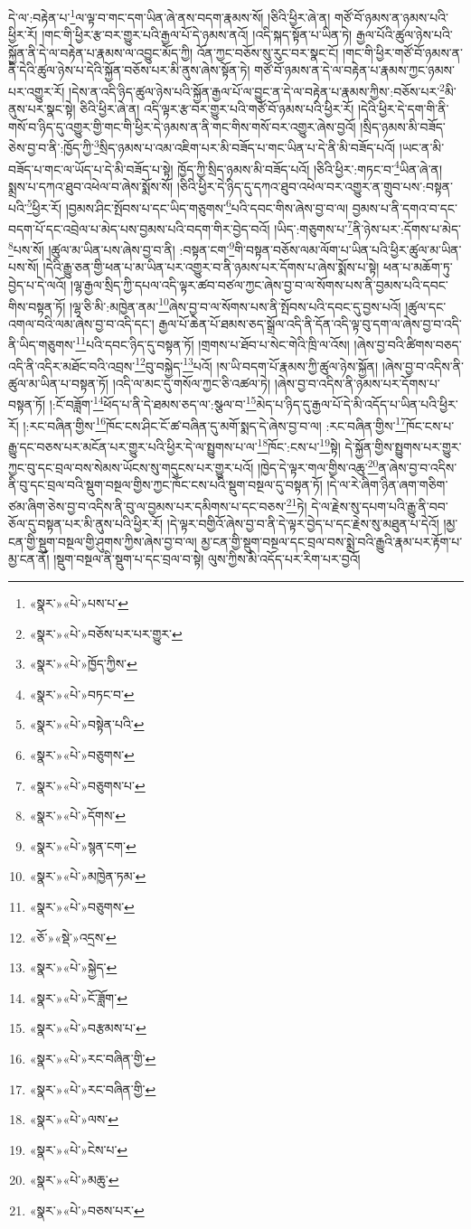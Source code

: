 དེ་ལ་:བརྟེན་པ་\footnote{«སྣར་»«པེ་»པས་པ་}ལ་ལྟ་བ་གང་དག་ཡིན་ཞེ་ནས་བདག་རྣམས་སོ། །ཅིའི་ཕྱིར་ཞེ་ན། གཙོ་བོ་ཉམས་ན་ཉམས་པའི་ཕྱིར་རོ། །གང་གི་ཕྱིར་རྩ་བར་གྱུར་པའི་རྒྱལ་པོ་དེ་ཉམས་ནའོ། །འདི་སྐད་སྟོན་པ་ཡིན་ཏེ། རྒྱལ་པོའི་ཚུལ་ཉེས་པའི་སྐྱོན་ནི་དེ་ལ་བརྟེན་པ་རྣམས་ལ་འབྱུང་མོད་ཀྱི། འོན་ཀྱང་བཅོས་སུ་རུང་བར་སྣང་ངོ། །གང་གི་ཕྱིར་གཙོ་བོ་ཉམས་ན་ནི་དེའི་ཚུལ་ཉེས་པ་དེའི་སྐྱོན་བཅོས་པར་མི་ནུས་ཞེས་སྟོན་ཏེ། གཙོ་བོ་ཉམས་ན་དེ་ལ་བརྟེན་པ་རྣམས་ཀྱང་ཉམས་པར་འགྱུར་རོ། །དེས་ན་འདི་ཉིད་ཚུལ་ཉེས་པའི་སྐྱོན་རྒྱལ་པོ་ལ་བྱུང་ན་དེ་ལ་བརྟེན་པ་རྣམས་ཀྱིས་:བཅོས་པར་\footnote{«སྣར་»«པེ་»བཅོས་པར་པར་གྱུར་}མི་ནུས་པར་སྣང་སྟེ། ཅིའི་ཕྱིར་ཞེ་ན། འདི་ལྟར་རྩ་བར་གྱུར་པའི་གཙོ་བོ་ཉམས་པའི་ཕྱིར་རོ། །དེའི་ཕྱིར་དེ་དག་གི་ནི་གསོ་བ་ཉིད་དུ་འགྱུར་གྱི་གང་གི་ཕྱིར་དེ་ཉམས་ན་ནི་གང་གིས་གསོ་བར་འགྱུར་ཞེས་བྱའོ། །སྲིད་ཉམས་མི་བཟོད་ཅེས་བྱ་བ་ནི་:ཁྱོད་ཀྱི་\footnote{«སྣར་»«པེ་»ཁྱོད་ཀྱིས་}སྲིད་ཉམས་པ་འམ་འཇིག་པར་མི་བཟོད་པ་གང་ཡིན་པ་དེ་ནི་མི་བཟོད་པའོ། །ཡང་ན་མི་བཟོད་པ་གང་ལ་ཡོད་པ་དེ་མི་བཟོད་པ་སྟེ། ཁྱོད་ཀྱི་སྲིད་ཉམས་མི་བཟོད་པའོ། །ཅིའི་ཕྱིར་:གཏང་བ་\footnote{«སྣར་»«པེ་»བཏང་བ་}ཡིན་ཞེ་ན། སྨྲས་པ་དཀའ་ཐུབ་འཕེལ་བ་ཞེས་སྨོས་སོ། །ཅིའི་ཕྱིར་དེ་ཉིད་དུ་དཀའ་ཐུབ་འཕེལ་བར་འགྱུར་ན་གྲུབ་པས་:བསྟན་པའི་\footnote{«སྣར་»«པེ་»བསྟེན་པའི་}ཕྱིར་རོ། །བྱམས་ཤིང་སྤོབས་པ་དང་ཡིད་གཅུགས་\footnote{«སྣར་»«པེ་»བཅུགས་}པའི་དབང་གིས་ཞེས་བྱ་བ་ལ། བྱམས་པ་ནི་དགའ་བ་དང་བདག་པོ་དང་འབྲེལ་པ་མེད་པས་བྱམས་པའི་བདག་གིར་བྱེད་བའོ། །ཡིད་:གཅུགས་པ་\footnote{«སྣར་»«པེ་»བཅུགས་པ་}ནི་ཉེས་པར་:དོགས་པ་མེད་\footnote{«སྣར་»«པེ་»དོགས་}པས་སོ། །ཚུལ་མ་ཡིན་པས་ཞེས་བྱ་བ་ནི། :བསྟན་ངག་\footnote{«སྣར་»«པེ་»སྙན་ངག་}གི་བསྟན་བཅོས་ལམ་ལོག་པ་ཡིན་པའི་ཕྱིར་ཚུལ་མ་ཡིན་པས་སོ། །དེའི་རྒྱུ་ཅན་གྱི་ཕན་པ་མ་ཡིན་པར་འགྱུར་བ་ནི་ཉམས་པར་དོགས་པ་ཞེས་སྨོས་པ་སྟེ། ཕན་པ་མཆོག་ཏུ་བྱེད་པ་དེ་ལའོ། །ལྷ་རྒྱལ་སྲིད་ཀྱི་དཔལ་འདི་ལྟར་ཚབ་བཙལ་ཀྱང་ཞེས་བྱ་བ་ལ་སོགས་པས་ནི་བྱམས་པའི་དབང་གིས་བསྟན་ཏོ། །ལྷ་ཅི་མི་:མཁྱེན་ནམ་\footnote{«སྣར་»«པེ་»མཁྱེན་ཏམ་}ཞེས་བྱ་བ་ལ་སོགས་པས་ནི་སྤོབས་པའི་དབང་དུ་བྱས་པའོ། །ཚུལ་དང་འགལ་བའི་ལམ་ཞེས་བྱ་བ་འདི་དང་། རྒྱལ་པོ་ཆེན་པོ་ཐམས་ཅད་སྒྲོལ་འདི་ནི་དོན་འདི་ལྟ་བུ་དག་ལ་ཞེས་བྱ་བ་འདི་ནི་ཡིད་གཅུགས་\footnote{«སྣར་»«པེ་»བཅུགས་}པའི་དབང་ཉིད་དུ་བསྟན་ཏོ། །གྲགས་པ་ཐོབ་པ་སེང་གེའི་ཁྲི་ལ་འོས། །ཞེས་བྱ་བའི་ཚིགས་བཅད་འདི་ནི་འདིར་མཐོང་བའི་འབྲས་\footnote{«ཅོ་»«སྡེ་»འདྲས་}བུ་བསྐྱེད་\footnote{«སྣར་»«པེ་»སྐྱེད་}པའོ། །ས་ཡི་བདག་པོ་རྣམས་ཀྱི་ཚུལ་ཉེས་སྐྱོན། །ཞེས་བྱ་བ་འདིས་ནི་ཚུལ་མ་ཡིན་པ་བསྟན་ཏོ། །འདི་ལ་མང་དུ་གསོལ་ཀྱང་ཅི་འཚལ་ཏེ། །ཞེས་བྱ་བ་འདིས་ནི་ཉམས་པར་དོགས་པ་བསྟན་ཏོ། །:ངོ་བཟློག་\footnote{«སྣར་»«པེ་»ངོ་ཟློག་}ཕོད་པ་ནི་དེ་ཐམས་ཅད་ལ་:སྩལ་བ་\footnote{«སྣར་»«པེ་»བརྩམས་པ་}མེད་པ་ཉིད་དུ་རྒྱལ་པོ་དེ་མི་འདོད་པ་ཡིན་པའི་ཕྱིར་རོ། །:རང་བཞིན་གྱིས་\footnote{«སྣར་»«པེ་»རང་བཞིན་གྱི་}ཁོང་ངས་ཤིང་ངོ་ཚ་བཞིན་དུ་མགོ་སྨད་དེ་ཞེས་བྱ་བ་ལ། :རང་བཞིན་གྱིས་\footnote{«སྣར་»«པེ་»རང་བཞིན་གྱི་}ཁོང་ངས་པ་རྒྱུ་དང་བཅས་པར་མངོན་པར་གྱུར་པའི་ཕྱིར་དེ་ལ་སྤྱུགས་པ་ལ་\footnote{«སྣར་»«པེ་»ལས་}ཁོང་:ངས་པ་\footnote{«སྣར་»«པེ་»ངེས་པ་}སྟེ། དེ་སྐྱོན་གྱིས་སྤྱུགས་པར་གྱུར་ཀྱང་བུ་དང་བྲལ་བས་སེམས་ཡོངས་སུ་གདུངས་པར་གྱུར་པའོ། །ཁྱེད་དེ་ལྟར་གལ་གྱིས་འཆུ་\footnote{«སྣར་»«པེ་»མཆུ་}ན་ཞེས་བྱ་བ་འདིས་ནི་བུ་དང་བྲལ་བའི་སྡུག་བསྔལ་གྱིས་ཀྱང་ཁོང་ངས་པའི་སྡུག་བསྔལ་དུ་བསྟན་ཏོ། །དེ་ལ་རེ་ཞིག་ཉིན་ཞག་གཅིག་ཙམ་ཞིག་ཅེས་བྱ་བ་འདིས་ནི་བུ་ལ་བྱམས་པར་དམིགས་པ་དང་བཅས་\footnote{«སྣར་»«པེ་»བཅས་པར་}ཏེ། དེ་ལ་རྗེས་སུ་དཔག་པའི་རྒྱུ་ནི་བབ་ཅོལ་དུ་བསྟན་པར་མི་ནུས་པའི་ཕྱིར་རོ། །དེ་ལྟར་བགྱིའོ་ཞེས་བྱ་བ་ནི་དེ་ལྟར་བྱེད་པ་དང་རྗེས་སུ་མཐུན་པ་དེའོ། །མྱ་ངན་གྱི་སྡུག་བསྔལ་གྱི་ཤུགས་ཀྱིས་ཞེས་བྱ་བ་ལ། མྱ་ངན་གྱི་སྡུག་བསྔལ་དང་བྲལ་བས་སྨྲེ་བའི་རྒྱུའི་རྣམ་པར་རྟོག་པ་མྱ་ངན་ནོ། །སྡུག་བསྔལ་ནི་སྡུག་པ་དང་བྲལ་བ་སྟེ། ལུས་ཀྱིས་མི་འདོད་པར་རིག་པར་བྱའོ། 